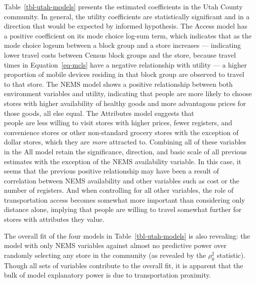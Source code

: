 \documentclass[
  letterpaper,
  authoryear,
  review,
  3p]{elsarticle}
\begin{document}
Table~\ref{tbl-utah-models} presents the estimated coefficients in the
Utah County community. In general, the utility coefficients are
statistically significant and in a direction that would be expected by
informed hypothesis. The Access model has a positive coefficient on its
mode choice log-sum term, which indicates that as the mode choice logsum
between a block group and a store increases --- indicating lower travel
costs between Census block groups and the store, because travel times in
Equation~\ref{eq-mcls} have a negative relationship with utility --- a
higher proportion of mobile devices residing in that block group are
observed to travel to that store. The NEMS model shows a positive
relationship between both environment variables and utility, indicating
that people are more likely to choose stores with higher availability of
healthy goods and more advantagous prices for those goods, all else
equal. The Attributes model suggests that\\
people are less willing to visit stores with higher prices, fewer
registers, and convenience stores or other non-standard grocery stores
with the exception of dollar stores, which they are \emph{more}
attracted to. Combining all of these variables in the All model retain
the significance, direction, and basic scale of all previous estimates
with the exception of the NEMS availability variable. In this case, it
seems that the previous positive relationship may have been a result of
correlation between NEMS availability and other variables such as cost
or the number of registers. And when controlling for all other
variables, the role of transportation access becomes somewhat more
important than considering only distance alone, implying that people are
willing to travel somewhat further for stores with attributes they
value.

The overall fit of the four models in Table~\ref{tbl-utah-models} is
also revealing: the model with only NEMS variables against almost no
predictive power over randomly selecting any store in the community (as
revealed by the \(\rho_0^2\) statistic). Though all sets of variables
contribute to the overall fit, it is apparent that the bulk of model
explanatory power is due to transportation proximity.
\end{document}
